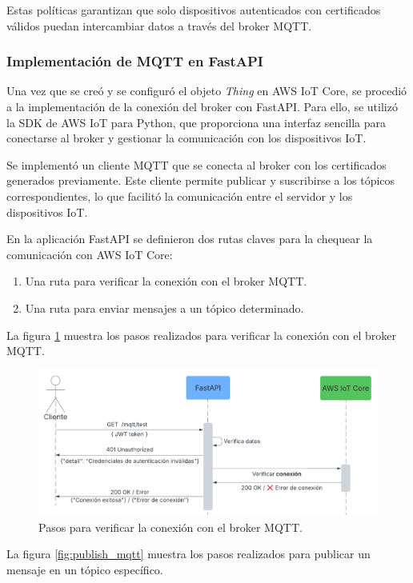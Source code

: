 Estas políticas garantizan que solo dispositivos autenticados con certificados
válidos puedan intercambiar datos a través del broker MQTT.

\subsubsection{Implementación de MQTT en FastAPI}
Una vez que se creó y se configuró el objeto \textit{Thing} en AWS IoT Core, se
procedió a la implementación de la conexión del broker con FastAPI. Para ello,
se utilizó la SDK de AWS IoT para Python, que proporciona una interfaz sencilla
para conectarse al broker y gestionar la comunicación con los dispositivos IoT.

Se implementó un cliente MQTT que se conecta al broker con los certificados
generados previamente. Este cliente permite publicar y suscribirse a los
tópicos correspondientes, lo que facilitó la comunicación entre el servidor y
los dispositivos IoT.

En la aplicación FastAPI se definieron dos rutas claves para la chequear la
comunicación con AWS IoT Core:

\begin{enumerate}
    \item Una ruta para verificar la conexión con el broker MQTT.
    \item Una ruta para enviar mensajes a un tópico determinado.
\end{enumerate}

La figura \ref{fig:test_mqtt} muestra los pasos realizados para verificar la
conexión con el broker MQTT.

\begin{figure}[H]
    \centering
    \includegraphics[width=.90\textwidth]{./Images/20.png}
    \caption{Pasos para verificar la conexión con el broker MQTT.}
    \label{fig:test_mqtt}
\end{figure}

La figura \ref{fig:publish_mqtt} muestra los pasos realizados para publicar un
mensaje en un tópico específico.

